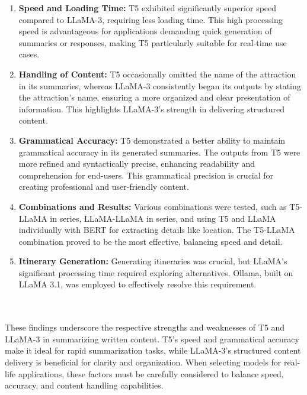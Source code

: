 \documentclass[conference]{IEEEtran}
\begin{document}
        \begin{enumerate}
            \item \textbf{Speed and Loading Time:}
            T5 exhibited significantly superior speed compared to LLaMA-3, requiring less loading time. This high processing speed is advantageous for applications demanding quick generation of summaries or responses, making T5 particularly suitable for real-time use cases.

            \item \textbf{Handling of Content:}
            T5 occasionally omitted the name of the attraction in its summaries, whereas LLaMA-3 consistently began its outputs by stating the attraction's name, ensuring a more organized and clear presentation of information. This highlights LLaMA-3's strength in delivering structured content.

            \item \textbf{Grammatical Accuracy:}
            T5 demonstrated a better ability to maintain grammatical accuracy in its generated summaries. The outputs from T5 were more refined and syntactically precise, enhancing readability and comprehension for end-users. This grammatical precision is crucial for creating professional and user-friendly content.

            \item \textbf{Combinations and Results:}
            Various combinations were tested, such as T5-LLaMA in series, LLaMA-LLaMA in series, and using T5 and LLaMA individually with BERT for extracting details like location. The T5-LLaMA combination proved to be the most effective, balancing speed and detail.

            \item \textbf{Itinerary Generation:}
            Generating itineraries was crucial, but LLaMA's significant processing time required exploring alternatives. Ollama, built on LLaMA 3.1, was employed to effectively resolve this requirement.
        \end{enumerate}
        {\\\\}
        These findings underscore the respective strengths and weaknesses of T5 and LLaMA-3 in summarizing written content. T5's speed and grammatical accuracy make it ideal for rapid summarization tasks, while LLaMA-3's structured content delivery is beneficial for clarity and organization. When selecting models for real-life applications, these factors must be carefully considered to balance speed, accuracy, and content handling capabilities.
\end{document}

